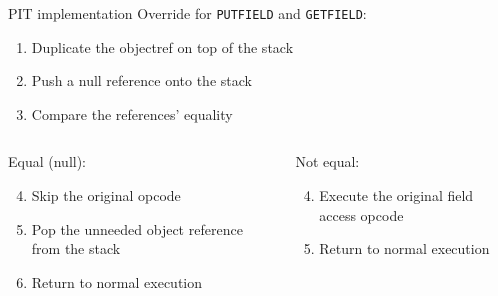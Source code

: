 \begin{frame}{PIT implementation}
  Override  for \lstinline{PUTFIELD} and \lstinline{GETFIELD}:
  \begin{enumerate}
  \item
    Duplicate the objectref on top of the stack
  \item
    Push a null reference onto the stack
  \item
    Compare the references' equality
  \end{enumerate}
  \begin{columns}[t,totalwidth=0.6\textwidth]
    \begin{column}{0.45\textwidth}
      Equal (null):
      \begin{enumerate}
        \setcounter{enumi}{3}
      \item
        Skip the original opcode
      \item
        Pop the unneeded object reference from the stack
      \item
        Return to normal execution
      \end{enumerate}
    \end{column}
    \begin{column}[]{0.45\textwidth}
      Not equal:
      \begin{enumerate}
        \setcounter{enumi}{3}
      \item
        Execute the original field access opcode
      \item
        Return to normal execution
      \end{enumerate}
    \end{column}
  \end{columns}
\end{frame}

